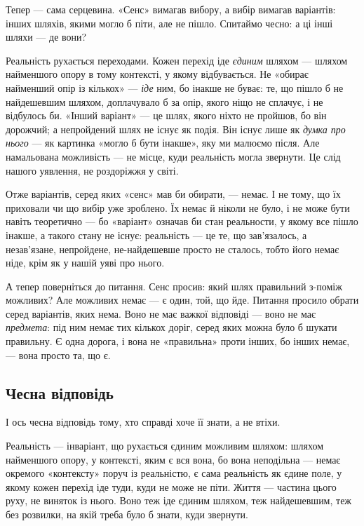 \documentclass[12pt, a4paper, openany]{book}
\begin{document}
Тепер --- сама серцевина. «Сенс» вимагав вибору, а вибір вимагав варіантів: інших шляхів, якими могло б піти, але не пішло. Спитаймо чесно: а ці інші шляхи --- де вони?

Реальність рухається переходами. Кожен перехід іде \emph{єдиним} шляхом --- шляхом найменшого опору в тому контексті, у якому відбувається. Не «обирає найменший опір із кількох» --- \emph{іде} ним, бо інакше не буває: те, що пішло б не найдешевшим шляхом, доплачувало б за опір, якого ніщо не сплачує, і не відбулось би. «Інший варіант» --- це шлях, якого ніхто не пройшов, бо він дорожчий; а непройдений шлях не існує як подія. Він існує лише як \emph{думка про нього} --- як картинка «могло б бути інакше», яку ми малюємо після. Але намальована можливість --- не місце, куди реальність могла звернути. Це слід нашого уявлення, не роздоріжжя у світі.

Отже варіантів, серед яких «сенс» мав би обирати, --- немає. І не тому, що їх приховали чи що вибір уже зроблено. Їх немає й ніколи не було, і не може бути навіть теоретично --- бо «варіант» означав би стан реальности, у якому все пішло інакше, а такого стану не існує: реальність --- це те, що зав'язалось, а незав'язане, непройдене, не-найдешевше просто не сталось, тобто його немає ніде, крім як у нашій уяві про нього.

А тепер поверніться до питання. Сенс просив: який шлях правильний з-поміж можливих? Але можливих немає --- є один, той, що йде. Питання просило обрати серед варіантів, яких нема. Воно не має важкої відповіді --- воно не має \emph{предмета}: під ним немає тих кількох доріг, серед яких можна було б шукати правильну. Є одна дорога, і вона не «правильна» проти інших, бо інших немає, --- вона просто та, що є.

\subsection{Чесна відповідь}

І ось чесна відповідь тому, хто справді хоче її знати, а не втіхи.

Реальність --- інваріант, що рухається єдиним можливим шляхом: шляхом найменшого опору, у контексті, яким є вся вона, бо вона неподільна --- немає окремого «контексту» поруч із реальністю, є сама реальність як єдине поле, у якому кожен перехід іде туди, куди не може не піти. Життя --- частина цього руху, не виняток із нього. Воно теж іде єдиним шляхом, теж найдешевшим, теж без розвилки, на якій треба було б знати, куди звернути.
\end{document}
